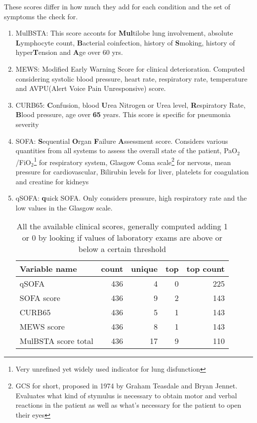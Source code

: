 \begin{enumerate}
These scores differ in how much they add for each condition and the set of symptoms the check for.
	\begin{enumerate}
		\item MulBSTA: This score acconts for \textbf{Mul}tilobe lung involvement, absolute \textbf{L}ymphocyte count, \textbf{B}acterial coinfection, history of \textbf{S}moking, history of hyper\textbf{T}ension and \textbf{A}ge over 60 yrs. \cite{MulBSTA}
		\item MEWS: Modified Early Warning Score for clinical deterioration. Computed considering systolic blood pressure, heart rate, respiratory rate, temperature and AVPU(Alert Voice Pain Unresponsive) score. \cite{MEWS}
		\item CURB65: \textbf{C}onfusion, blood \textbf{U}rea Nitrogen or Urea level, \textbf{R}espiratory Rate, \textbf{B}lood pressure, age over \textbf{65} years. This score is specific for pneumonia severity \cite{CURB65}
		\item SOFA:  \textbf{S}equential  \textbf{O}rgan  \textbf{F}ailure  \textbf{A}ssessment score. Considers various quantities from all systems to assess the overall state of the patient, PaO$_2$/FiO$_2$\footnote{Very unrefined yet widely used indicator for lung disfunction} for respiratory system, Glasgow Coma scale\footnote{GCS for short, proposed in 1974 by Graham Teasdale and Bryan Jennet. Evaluates what kind of stymulus is necessary to obtain motor and verbal reactions in the patient as well as what's necessary for the patient to open their eyes} for nervous, mean pressure for cardiovascular, Bilirubin levels for liver, platelets for coagulation and creatine for kidneys \cite{SOFA}
		\item qSOFA:  \textbf{q}uick SOFA. Only considers pressure, high respiratory rate and the low values in the Glasgow scale.
			\begin{table}[htbp]
			\caption{All the available clinical scores, generally computed adding 1 or 0 by looking if values of laboratory exams are above or below a certain threshold \label{tab:ClinicalScores}}
\centering
			\begin{tabular}{lrrrr}
			\toprule
			Variable name &  count &  unique &  top &  top count \\
			\midrule
			qSOFA               &    436 &       4 &    0 &   225 \\
			SOFA score          &    436 &       9 &    2 &   143 \\
			CURB65              &    436 &       5 &    1 &   143 \\
			MEWS score          &    436 &       8 &    1 &   143 \\
			MulBSTA score total &    436 &      17 &    9 &   110 \\
			\bottomrule
			\end{tabular}
			\end{table}
	\end{enumerate}
\end{enumerate}

